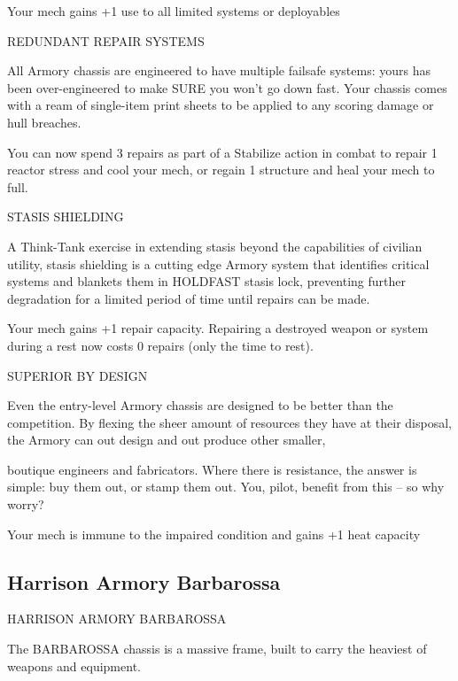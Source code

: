 Your mech gains +1 use to all limited systems or deployables
 

REDUNDANT REPAIR SYSTEMS  

All Armory chassis are engineered to have multiple failsafe systems: yours has been over-engineered to  
make SURE you won’t go down fast. Your chassis comes with a ream of single-item print sheets to be  
applied to any scoring damage or hull breaches.    

You can now spend 3 repairs as part of a Stabilize action in combat to repair 1 reactor stress and  
cool your mech, or regain 1 structure and heal your mech to full.
 

STASIS SHIELDING  

A Think-Tank exercise in extending stasis beyond the capabilities of civilian utility, stasis shielding is a  
cutting edge Armory system that identifies critical systems and blankets them in HOLDFAST stasis lock,  
preventing further degradation for a limited period of time until repairs can be made.   

Your mech gains +1 repair capacity. Repairing a destroyed weapon or system during a rest now  
costs 0 repairs (only the time to rest).
 

                                                                                                                 


SUPERIOR BY DESIGN  

Even the entry-level Armory chassis are designed to be better than the competition. By flexing the sheer  
amount of resources they have at their disposal, the Armory can out design and out produce other smaller,  

boutique engineers and fabricators. Where there is resistance, the answer is simple: buy them out, or  
stamp them out. You, pilot, benefit from this -- so why worry?   

Your mech is immune to the impaired condition and gains +1 heat capacity
 

                                                                                                          
\subsection{Harrison Armory Barbarossa}

                           HARRISON ARMORY BARBAROSSA  

The BARBAROSSA chassis is a massive frame, built to carry the heaviest of weapons and equipment.  

